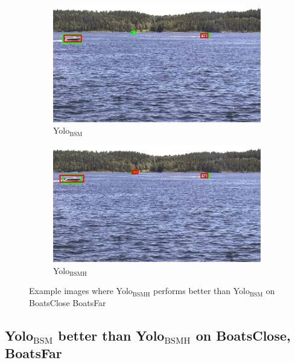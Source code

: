 \begin{figure}[h!]
\begin{subfigure}{.5\textwidth}
  \centering
  \includegraphics[width=0.9\linewidth]{results/case_buildings/yolo23/3better/yolo2/selected_06_25_frame0264.jpg}
  \caption{Yolo$_{\text{BSM}}$}
\end{subfigure}%
\begin{subfigure}{.5\textwidth}
  \centering
  \includegraphics[width=.9\linewidth]{results/case_buildings/yolo23/3better/yolo3/selected_06_25_frame0264.jpg}
  \caption{Yolo$_{\text{BSMH}}$}
\end{subfigure}
\caption{Example images where Yolo$_{\text{BSMH}}$ performs better than Yolo$_{\text{BSM}}$ on BoatsClose BoatsFar}
\label{img:yolo3_better}

\end{figure}

\newpage

\subsection{Yolo$_{\text{BSM}}$ better than Yolo$_{\text{BSMH}}$ on BoatsClose, BoatsFar}
\label{sec:2better}

